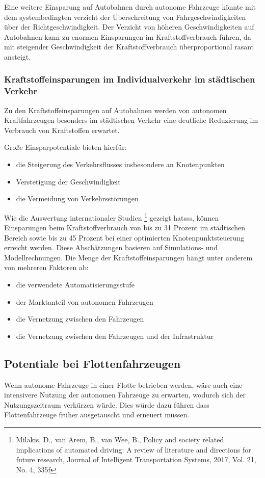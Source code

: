 Eine weitere Einsparung auf Autobahnen durch autonome Fahrzeuge könnte mit
dem systembedingten verzicht der Überschreitung von Fahrgeschwindigkeiten über der Richtgeschwindigkeit.
Der Verzicht von höheren Geschwindigkeiten auf Autobahnen kann zu enormen Einsparungen im Kraftstoffverbrauch führen,
da mit steigender Geschwindigkeit der Kraftstoffverbrauch überproportional rasant ansteigt.

\subsubsection{Kraftstoffeinsparungen im Individualverkehr im städtischen Verkehr}
Zu den Kraftstoffeinsparungen auf Autobahnen werden von
autonomen Kraftfahrzeugen besonders im städtischen Verkehr
eine deutliche Reduzierung im Verbrauch von Kraftstoffen erwartet.

Große Einsparpotentiale bieten hierfür:
\begin{itemize}
	\item die Steigerung des Verkehrsflusses insbesondere an Knotenpunkten
	\item Verstetigung der Geschwindigkeit
	\item die Vermeidung von Verkehrsstörungen
\end{itemize}

Wie die Auswertung internationaler Studien
\footnote{Milakis, D., van Arem, B., van Wee, B., Policy and society related implications of
	automated driving: A review of literature and directions for future research, Journal of
	Intelligent Transportation Systems, 2017, Vol. 21, No. 4, 335f} gezeigt hatsss,
können Einsparungen beim Kraftstoffverbrauch von
bis zu 31 Prozent im städtischen Bereich sowie
bis zu 45 Prozent bei einer optimierten Knotenpunktsteuerung erreicht werden.
Diese Abschätzungen basieren auf Simulations- und Modellrechnungen.
Die Menge der  Kraftstoffeinsparungen hängt unter anderem von mehreren Faktoren ab:
\begin{itemize}
	\item die verwendete Automatisierungsstufe
	\item der Marktanteil von autonomen Fahrzeugen
	\item die Vernetzung zwischen den Fahrzeugen
	\item die Vernetzung zwischen den Fahrzeugen und der Infrastruktur
\end{itemize}

\subsection{Potentiale bei Flottenfahrzeugen}
Wenn autonome Fahrzeuge in einer Flotte betrieben werden, wäre auch eine intensivere Nutzung der autonomen Fahrzeuge zu erwarten,
wodurch sich der Nutzungszeitraum verkürzen würde.
Dies würde dazu führen dass Flottenfahrzeuge früher ausgetauscht und erneuert müssen.

